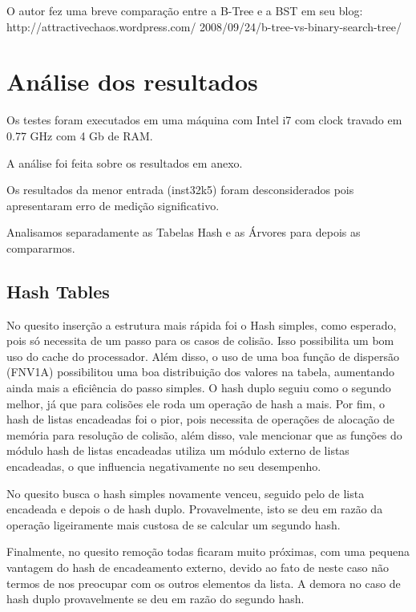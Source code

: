 \documentclass[twoside]{article}
\begin{document}
\begin{multicols}{2}
\indent	O autor fez uma breve comparação entre a B-Tree e a BST em seu blog: 
	http://attractivechaos.wordpress.com/
	2008/09/24/b-tree-vs-binary-search-tree/

\section{Análise dos resultados}
\indent	Os testes foram executados em uma máquina com Intel i7 com clock travado em 0.77 GHz com 4 Gb de RAM. 

\indent	A análise foi feita sobre os resultados em anexo. 

\indent	Os resultados da menor entrada (inst32k5) foram  desconsiderados pois apresentaram erro de medição significativo.

\indent	Analisamos separadamente as Tabelas Hash e as Árvores para depois as compararmos.

\subsection{Hash Tables}	
\indent	No quesito inserção a estrutura mais rápida foi o Hash simples, como esperado, pois só necessita de um passo para os casos de colisão. Isso possibilita um bom uso do cache do processador. Além disso, o uso de uma boa função de dispersão (FNV1A) possibilitou uma boa distribuição dos valores na tabela, aumentando ainda mais a eficiência do passo simples. O hash duplo seguiu como o segundo melhor, já que para colisões ele roda um operação de hash a mais. Por fim, o hash de listas encadeadas foi o pior, pois necessita de operações de alocação de memória para resolução de colisão, além disso, vale mencionar que as funções do módulo hash de listas encadeadas utiliza um módulo externo de listas encadeadas, o que influencia negativamente no seu desempenho. 

\indent	No quesito busca o hash simples novamente venceu, seguido pelo de lista encadeada e depois o de hash duplo. Provavelmente, isto se deu em razão da operação ligeiramente mais custosa de se calcular um segundo hash.

\indent	Finalmente, no quesito remoção todas ficaram muito próximas, com uma pequena vantagem do hash de encadeamento externo, devido ao fato de neste caso não termos de nos preocupar com os outros elementos da lista. A demora no caso de hash duplo provavelmente se deu em razão do segundo hash.


\end{multicols}
\end{document}
